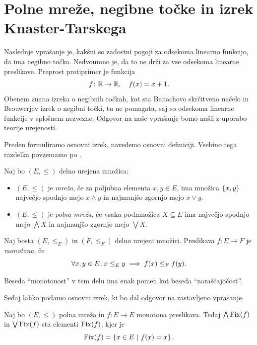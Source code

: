\section{Polne mreže, negibne točke in izrek Knaster-Tarskega}

Naslednje vprašanje je, kakšni so zadostni pogoji za odsekoma linearno funkcijo, da ima negibno točko. Nedvoumno je, da to ne drži za vse odsekoma linearne preslikave. Preprost protiprimer je funkcija 
\[
f \colon \mathbb{R} \to \mathbb{R},\quad f(x) = x + 1.
\]
%
Obenem znana izreka o negibnih točkah, kot sta Banachovo skrčitveno načelo in Brouwerjev izrek o negibni točki, tu ne pomagata, saj so odsekoma linearne funkcije v splošnem nezvezne. Odgovor na naše vprašanje bomo našli z uporabo teorije urejenosti.

Preden formuliramo osnovni izrek, navedemo osnovni definiciji. Vsebino tega razdelka povzemamo po \cite[1.\ poglavje]{zbMATH01576861}.

\begin{definicija}
    Naj bo \((E, \leq)\) delno urejena množica:
    \begin{itemize}
        \item \((E, \leq)\) je \emph{mreža}, če za poljubna elementa \(x, y \in E\), ima množica \(\left\{x, y\right\}\) največjo spodnjo mejo \(x \land y\) in najmanjšo zgornjo mejo \(x \lor y\). 
        \item \((E, \leq)\) je \emph{polna mreža}, če vsaka podmnožica \(X \subseteq E\) ima  največjo spodnjo mejo \(\bigwedge X\) in najmanjšo zgornjo mejo \(\bigvee X\). 
    \end{itemize}
\end{definicija}

\begin{definicija}
    Naj bosta \((E, \leq_E)\) in \((F, \leq_F)\) delno urejeni množici. Preslikava \(f \colon E \to F\) je \emph{monotona}, če
    \[
        \forall x, y \in E \,.\, x \leq_E y \implies f(x) \leq_F f(y).
    \]
\end{definicija}

\begin{opomba}
  Beseda "`monotonost"' v tem delu ima enak pomen kot beseda "`naraš\-čajočost"'.
\end{opomba}

Sedaj lahko podamo osnovni izrek, ki bo dal odgovor na zastavljeno vprašanje.
\begin{izrek}
  \label{izr:knaster-tarski}
  Naj bo \((E, \leq)\) polna mreža in \(f \colon E \to E\) monotona preslikava. Tedaj \(\bigwedge \operatorname{Fix}(f)\) in  \(\bigvee \operatorname{Fix}(f)\) sta elementi \(\operatorname{Fix}(f)\), kjer je 
  \[
    \operatorname{Fix}(f) = \left\{x \in E \ | \ f(x) = x\right\}.
  \]
\end{izrek}

